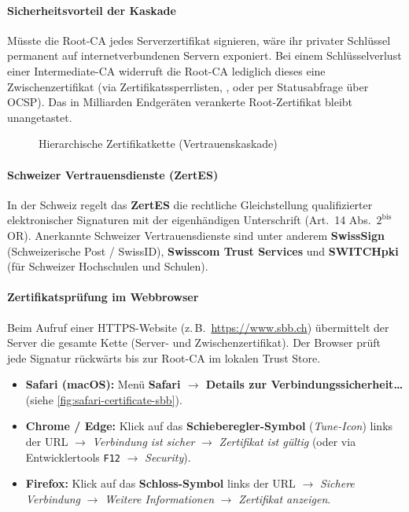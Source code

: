 \paragraph*{Sicherheitsvorteil der Kaskade}
Müsste die Root-\gls{CA} jedes Serverzertifikat signieren, wäre ihr privater Schlüssel permanent auf internetverbundenen Servern exponiert. Bei einem Schlüsselverlust einer Intermediate-\gls{CA} widerruft die Root-\gls{CA} lediglich dieses eine Zwischenzertifikat (via Zertifikatssperrlisten, , oder per Statusabfrage über \gls{OCSP}). Das in Milliarden Endgeräten verankerte Root-Zertifikat bleibt unangetastet.

\begin{figure}[H]
	\centering
	
	\caption{Hierarchische Zertifikatkette (Vertrauenskaskade)}
	\label{fig:certificate-chain}
\end{figure}

\paragraph*{Schweizer Vertrauensdienste (\texorpdfstring{\acrshort{ZertES}}{ZertES})}
In der Schweiz regelt das \textbf{\gls{ZertES}} die rechtliche Gleichstellung qualifizierter elektronischer Signaturen mit der eigenhändigen Unterschrift (Art.~14 Abs.~$2^{\text{bis}}$ OR). Anerkannte Schweizer Vertrauensdienste sind unter anderem \textbf{SwissSign} (Schweizerische Post / SwissID), \textbf{Swisscom Trust Services} und \textbf{SWITCHpki} (für Schweizer Hochschulen und Schulen).

\paragraph*{Zertifikatsprüfung im Webbrowser}
Beim Aufruf einer \gls{HTTPS}-Website (z.\,B.\ \url{https://www.sbb.ch}) übermittelt der Server die gesamte Kette (Server- und Zwischenzertifikat). Der Browser prüft jede Signatur rückwärts bis zur Root-\gls{CA} im lokalen Trust Store.

\begin{itemize}
	\item \textbf{Safari (macOS):} Menü \textbf{Safari $\rightarrow$ Details zur Verbindungssicherheit\dots} (siehe \cref{fig:safari-certificate-sbb}).
	\item \textbf{Chrome / Edge:} Klick auf das \textbf{Schieberegler-Symbol} (\emph{Tune-Icon}) links der \gls{URL} $\rightarrow$ \emph{Verbindung ist sicher} $\rightarrow$ \emph{Zertifikat ist gültig} (oder via Entwicklertools \texttt{F12} $\rightarrow$ \emph{Security}).
	\item \textbf{Firefox:} Klick auf das \textbf{Schloss-Symbol} links der \gls{URL} $\rightarrow$ \emph{Sichere Verbindung} $\rightarrow$ \emph{Weitere Informationen} $\rightarrow$ \emph{Zertifikat anzeigen}.
\end{itemize}

